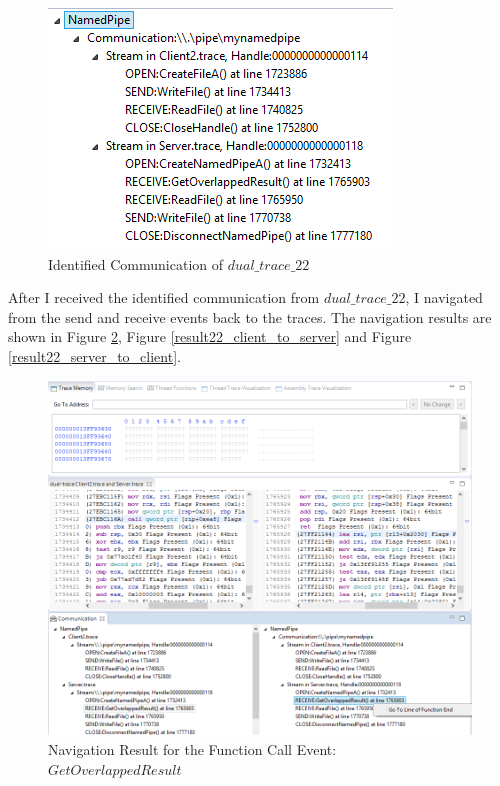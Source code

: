 \begin{figure}[H]
\centerline{\includegraphics{Figures/result22_communications}}
 \caption{Identified Communication of $dual\_trace\_22$}
\label{result22_communications}
\end{figure}

After I received the identified communication from $dual\_trace\_22$, I navigated from the send and receive events back to the traces. The navigation results are shown in Figure \ref{result22_server_readnull}, Figure \ref{result22_client_to_server} and Figure \ref{result22_server_to_client}.

\begin{figure}[H]
\centerline{\includegraphics[scale=0.35]{Figures/result22_server_readnull}}
 \caption{Navigation Result for the Function Call Event: $GetOverlappedResult$}
\label{result22_server_readnull}
\end{figure}

